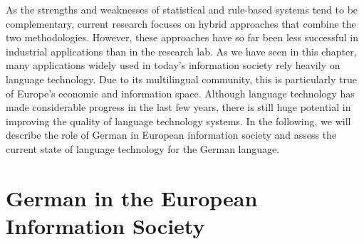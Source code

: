 \documentclass[]{../metanetpaper}
\begin{document}
As the strengths and weaknesses of statistical and rule-based systems tend to be complementary, current research focuses on hybrid approaches that combine the two methodologies. However, these approaches have so far been less successful in industrial applications than in the research lab. 
As we have seen in this chapter, many applications widely used in today’s information society rely heavily on language technology. Due to its multilingual community, this is particularly true of Europe’s economic and information space. Although language technology has made considerable progress in the last few years, there is still huge potential in improving the quality of language technology systems. In the following, we will describe the role of German in European information society and assess the current state of language technology for the German language. 
	\clearpage
	
	\section{German in the European Information Society}
\end{document}
